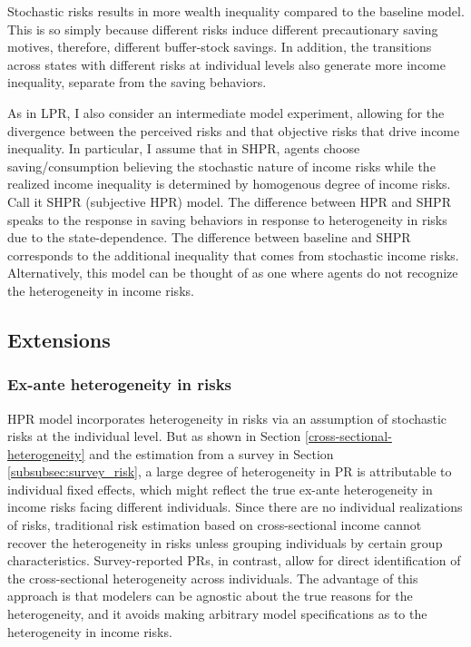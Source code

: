 Stochastic risks results in more wealth inequality compared to the baseline model. This is so simply because different risks induce different precautionary saving motives, therefore, different buffer-stock savings. In addition, the transitions across states with different risks at individual levels also generate more income inequality, separate from the saving behaviors. 

As in LPR, I also consider an intermediate model experiment, allowing for the divergence between the perceived risks and that objective risks that drive income inequality. In particular, I assume that in SHPR, agents choose saving/consumption believing the stochastic nature of income risks while the realized income inequality is determined by homogenous degree of income risks. Call it SHPR (subjective HPR) model. The difference between HPR and SHPR speaks to the response in saving behaviors in response to heterogeneity in risks due to the state-dependence. The difference between baseline and SHPR corresponds to the additional inequality that comes from stochastic income risks.  Alternatively, this model can be thought of as one where agents do not recognize the heterogeneity in income risks. 

\subsection{Extensions}

\subsubsection{Ex-ante heterogeneity in risks}

HPR model incorporates heterogeneity in risks via an assumption of stochastic risks at the individual level. But as shown in Section \ref{cross-sectional-heterogeneity} and the estimation from a survey in Section \ref{subsubsec:survey_risk}, a large degree of heterogeneity in PR is attributable to individual fixed effects, which might reflect the true ex-ante heterogeneity in income risks facing different individuals. Since there are no individual realizations of risks, traditional risk estimation based on cross-sectional income cannot recover the heterogeneity in risks unless grouping individuals by certain group characteristics. Survey-reported PRs, in contrast, allow for direct identification of the cross-sectional heterogeneity across individuals. The advantage of this approach is that modelers can be agnostic about the true reasons for the heterogeneity, and it avoids making arbitrary model specifications as to the heterogeneity in income risks.

